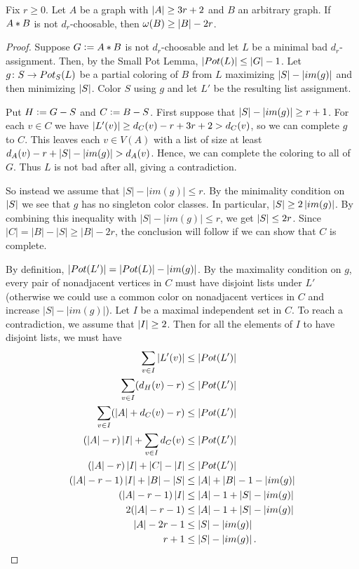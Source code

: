 \begin{lem}\label{ArbitraryJoin}
Fix $r \geq 0$.  Let $A$ be a graph with $\left|A\right| \geq 3r+2$ and $B$ an arbitrary graph.  If $A \mbox{\hspace{2 pt}$\ast$\hspace{2 pt}} B$ is not $d_r$-choosable, then
$\omega(B) \geq \left|B\right| - 2r$.
\end{lem}
\begin{proof}
Suppose $G \mathrel{\mathop:}= A \mbox{\hspace{2 pt}$\ast$\hspace{2 pt}} B$ is not $d_r$-choosable and let $L$ be a minimal bad $d_r$-assignment. Then, by the Small Pot Lemma, $\left|Pot(L)\right| \leq \left|G\right| - 1$.  Let $g\colon S \rightarrow Pot_S(L)$ be a partial coloring of $B$ from $L$ maximizing $\left|S\right| - \left|im(g)\right|$ and then minimizing $\left|S\right|$.  Color $S$ using $g$ and let $L'$ be the resulting list assignment.

Put $H \mathrel{\mathop:}= G - S$ and $C \mathrel{\mathop:}= B - S$. 
First suppose that $\left|S\right|- \left|im(g)\right| \geq r+1$. 
For each $v \in C$ we have $\left|L'(v)\right| \geq d_C(v) - r + 3r+2 > d_C(v)$, so we
can complete $g$ to $C$.
This leaves each $v \in V(A)$ with a list of size at least $d_A(v) - r +
\left|S\right| - \left|im(g)\right| > d_A(v)$.  Hence, we can complete the coloring to all
of $G$.  Thus $L$ is not bad after all, giving a contradiction.  

So instead we assume that $|S|-|im(g)|\le r$.
By the minimality condition on $\left|S\right|$ we see that $g$ has
no singleton color classes.  In particular, $\left|S\right| \geq 2\left|im(g)\right|$.  By
combining this inequality with $|S|-|im(g)|\le r$, we get $\left|S\right| \leq 2r$.
Since $|C|=|B|-|S|\ge |B|-2r$, the conclusion will follow if we can show that $C$ is complete.

By definition, $\left|Pot(L')\right| = \left|Pot(L)\right| - \left|im(g)\right|$.
By the maximality condition on $g$, every pair of nonadjacent vertices in $C$
must have disjoint lists under $L'$ (otherwise we could use a common color on
nonadjacent vertices in $C$ and increase $|S|-|im(g)|$).  
Let $I$ be a maximal independent set in $C$.  To reach a contradiction, we assume
that $\left|I\right| \geq 2$.
Then for all the elements of $I$ to have disjoint lists, we must have
\begin{align*}
 \sum_{v \in I} \left|L'(v)\right| &\leq \left|Pot(L')\right| \\
 \sum_{v \in I} (d_H(v) - r) &\leq \left|Pot(L')\right| \\
 \sum_{v \in I} (\left|A\right| + d_C(v) - r) &\leq \left|Pot(L')\right| \\
 (\left|A\right|-r)\left|I\right| + \sum_{v \in I} d_C(v) &\leq \left|Pot(L')\right| \\
 (\left|A\right|-r)\left|I\right| + \left|C\right| - \left|I\right| &\leq \left|Pot(L')\right| \\
 (\left|A\right| - r - 1)\left|I\right| + \left|B\right|- \left|S\right|&\leq \left|A\right| + \left|B\right| - 1 - \left|im(g)\right| \\
 (\left|A\right| - r - 1)\left|I\right| &\leq \left|A\right| - 1 + \left|S\right| - \left|im(g)\right| \\
 2(\left|A\right| - r - 1) &\leq \left|A\right| - 1 + \left|S\right| - \left|im(g)\right| \\
 \left|A\right| - 2r - 1 &\leq \left|S\right| - \left|im(g)\right| \\
 r + 1 &\leq \left|S\right| - \left|im(g)\right|.
\end{align*}


\end{proof}
